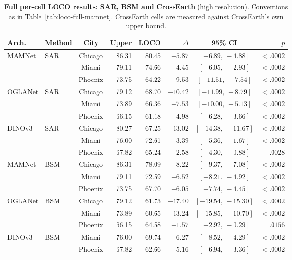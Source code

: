 \begin{table}[h]
\centering
\footnotesize
\setlength{\tabcolsep}{4pt}
\caption{
\textbf{Full per-cell LOCO results: SAR, BSM and CrossEarth} (high resolution).
Conventions as in Table~\ref{tab:loco-full-mamnet}.  CrossEarth cells are
measured against CrossEarth's own upper bound.
}
\label{tab:loco-full-hr}
\begin{tabular}{@{}llcrrrcr@{}}
\toprule
\textbf{Arch.} & \textbf{Method} & \textbf{City} & \textbf{Upper} & \textbf{LOCO} & $\Delta$ & \textbf{95\% CI} & $p$ \\
\midrule
MAMNet & SAR & Chicago & 86.31 & 80.45 & $-5.87$ & $[-6.89,\,-4.88]$ & $<\!.0002$ \\
 &  & Miami & 79.11 & 74.66 & $-4.45$ & $[-6.05,\,-2.93]$ & $<\!.0002$ \\
 &  & Phoenix & 73.75 & 64.22 & $-9.53$ & $[-11.51,\,-7.54]$ & $<\!.0002$ \\
\cmidrule(l){1-8}
OGLANet & SAR & Chicago & 79.12 & 68.70 & $-10.42$ & $[-11.99,\,-8.79]$ & $<\!.0002$ \\
 &  & Miami & 73.89 & 66.36 & $-7.53$ & $[-10.00,\,-5.13]$ & $<\!.0002$ \\
 &  & Phoenix & 66.15 & 61.18 & $-4.98$ & $[-6.28,\,-3.66]$ & $<\!.0002$ \\
\cmidrule(l){1-8}
DINOv3 & SAR & Chicago & 80.27 & 67.25 & $-13.02$ & $[-14.38,\,-11.67]$ & $<\!.0002$ \\
 &  & Miami & 76.00 & 72.61 & $-3.39$ & $[-5.36,\,-1.67]$ & $<\!.0002$ \\
 &  & Phoenix & 67.82 & 65.24 & $-2.58$ & $[-4.30,\,-0.88]$ & $.0028$ \\
\cmidrule(l){1-8}
MAMNet & BSM & Chicago & 86.31 & 78.09 & $-8.22$ & $[-9.37,\,-7.08]$ & $<\!.0002$ \\
 &  & Miami & 79.11 & 72.59 & $-6.52$ & $[-8.21,\,-4.92]$ & $<\!.0002$ \\
 &  & Phoenix & 73.75 & 67.70 & $-6.05$ & $[-7.74,\,-4.45]$ & $<\!.0002$ \\
\cmidrule(l){1-8}
OGLANet & BSM & Chicago & 79.12 & 61.73 & $-17.40$ & $[-19.54,\,-15.30]$ & $<\!.0002$ \\
 &  & Miami & 73.89 & 60.65 & $-13.24$ & $[-15.85,\,-10.70]$ & $<\!.0002$ \\
 &  & Phoenix & 66.15 & 64.58 & $-1.57$ & $[-2.92,\,-0.29]$ & $.0156$ \\
\cmidrule(l){1-8}
DINOv3 & BSM & Miami & 76.00 & 69.74 & $-6.27$ & $[-8.52,\,-4.29]$ & $<\!.0002$ \\
 &  & Phoenix & 67.82 & 62.66 & $-5.16$ & $[-6.94,\,-3.36]$ & $<\!.0002$ \\

\end{tabular}
\end{table}
